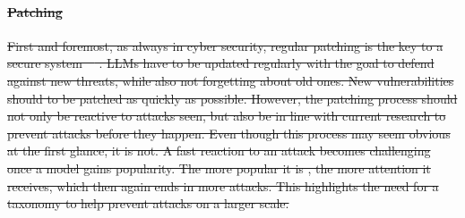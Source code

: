 \documentclass[a4paper,sigconf]{acmart}
\providecommand{\DIFaddtex}[1]{{\protect\color{blue}\uwave{#1}}} %
\providecommand{\DIFdeltex}[1]{{\protect\color{red}\sout{#1}}}                      %
\providecommand{\DIFaddbegin}{} %
\providecommand{\DIFaddend}{} %
\providecommand{\DIFdelbegin}{} %
\providecommand{\DIFdelend}{} %
\providecommand{\DIFadd}[1]{\texorpdfstring{\DIFaddtex{#1}}{#1}} %
\providecommand{\DIFdel}[1]{\texorpdfstring{\DIFdeltex{#1}}{}} %
\begin{document}
\DIFaddbegin 

\DIFaddend \paragraph{\DIFdelbegin \DIFdel{Patching}\DIFdelend \DIFaddbegin \DIFadd{Data Processing}\DIFaddend }
\DIFdelbegin \DIFdel{First and foremost, as always in cyber security, regular patching is the key to a secure system~\mbox{%
\cite{10.1145/3133956.3134072}}\hskip0pt%
. 
LLMs have to be updated regularly with the goal to defend against new threats, while also not forgetting about old ones. 
New vulnerabilities should to be patched as quickly as possible. 
However, the patching process should not only be reactive to attacks seen, but also be in line with current research to prevent attacks before they happen. 
Even though this process may seem obvious at the first glance, it is not. 
A fast reaction to an attack becomes challenging once a model gains popularity. 
The more popular it is , the more attention it receives, which then again ends in more attacks. 
This highlights the need for a taxonomy to help prevent attacks on a larger scale.
}%

\end{document}
